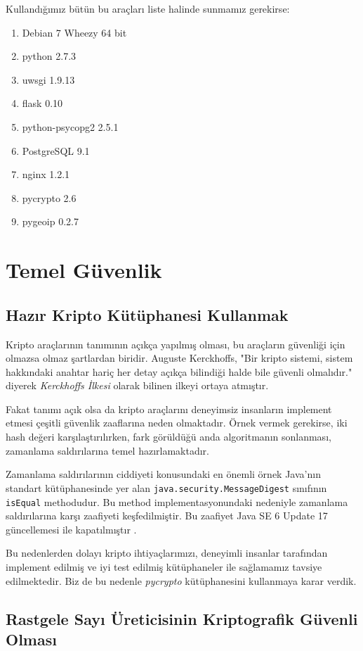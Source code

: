 \documentclass[11pt]{report}
\begin{document}
Kullandığımız bütün bu araçları liste halinde sunmamız gerekirse:

\begin{enumerate}
\item Debian 7 Wheezy 64 bit
\item python 2.7.3
\item uwsgi 1.9.13
\item flask 0.10
\item python-psycopg2 2.5.1
\item PostgreSQL 9.1
\item nginx 1.2.1
\item pycrypto 2.6
\item pygeoip 0.2.7
\end{enumerate}


\chapter{Temel Güvenlik}
\section{Hazır Kripto Kütüphanesi Kullanmak}
Kripto araçlarının tanımının açıkça yapılmış olması, bu araçların güvenliği için olmazsa olmaz şartlardan biridir. Auguste Kerckhoffs, "Bir kripto sistemi, sistem hakkındaki anahtar hariç her detay açıkça bilindiği halde bile güvenli olmalıdır."\cite{kerckhoffs} diyerek \emph{Kerckhoffs İlkesi} olarak bilinen ilkeyi ortaya atmıştır.

Fakat tanımı açık olsa da kripto araçlarını deneyimsiz insanların implement etmesi çeşitli güvenlik zaaflarına neden olmaktadır. Örnek vermek gerekirse, iki hash değeri karşılaştırılırken, fark görüldüğü anda algoritmanın sonlanması, zamanlama saldırılarına temel hazırlamaktadır.

Zamanlama saldırılarının ciddiyeti konusundaki en önemli örnek Java'nın standart kütüphanesinde yer alan \texttt{java.security.MessageDigest} sınıfının \texttt{isEqual} methodudur. Bu method implementasyonundaki nedeniyle zamanlama saldırılarına karşı zaafiyeti keşfedilmiştir. Bu zaafiyet Java SE 6 Update 17 güncellemesi ile kapatılmıştır \cite{javavul}.

Bu nedenlerden dolayı kripto ihtiyaçlarımızı, deneyimli insanlar tarafından implement edilmiş ve iyi test edilmiş kütüphaneler ile sağlamamız tavsiye edilmektedir. Biz de bu nedenle \emph{pycrypto} kütüphanesini kullanmaya karar verdik.

\section{Rastgele Sayı Üreticisinin Kriptografik Güvenli Olması}
\end{document}
